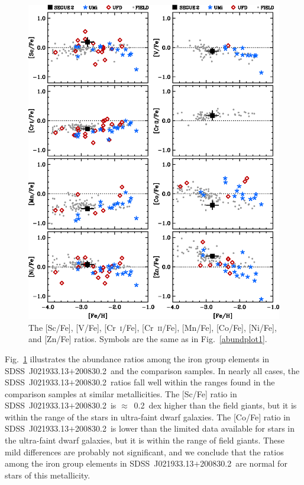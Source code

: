 \documentclass[useAMS,usenatbib,usegraphicx]{mn2e}
\def\seg{\mbox{SDSS~J021933.13$+$200830.2}}
\begin{document}
\begin{figure}
\centering
\includegraphics[angle=00,width=5.0in]{fig5.eps}
\caption{
\label{abundplot3}
The [Sc/Fe], [V/Fe], [Cr~\textsc{i}/Fe], [Cr~\textsc{ii}/Fe],
[Mn/Fe], [Co/Fe], [Ni/Fe], and [Zn/Fe] ratios.
Symbols are the same as in Fig.~\ref{abundplot1}.
}
\end{figure}


Fig.~\ref{abundplot3} illustrates the abundance ratios
among the iron group elements in \seg\ and the comparison samples.
In nearly all cases, the \seg\ ratios fall well within the 
ranges found in the comparison samples at similar metallicities.
The [Sc/Fe] ratio in \seg\ is $\approx$~0.2~dex higher than the
field giants, but it is within the range of the stars
in ultra-faint dwarf galaxies.
The [Co/Fe] ratio in \seg\ is lower than the limited
data available for stars in the ultra-faint dwarf galaxies,
but it is within the range of field giants.
These mild differences are probably not significant,
and we conclude that the ratios among the iron group
elements in \seg\ are normal for 
stars of this metallicity.
\end{document}
